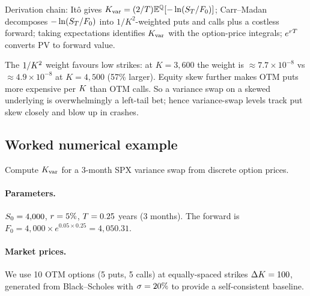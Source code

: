 \noindent
Derivation chain: It\^o gives
$K_{\text{var}}=(2/T)\mathbb{E}^{\mathbb{Q}}[-\ln(S_T/F_0)]$;
Carr--Madan decomposes $-\ln(S_T/F_0)$ into $1/K^2$-weighted
puts and calls plus a costless forward; taking expectations identifies
$K_{\text{var}}$ with the option-price integrals; $e^{rT}$
converts PV to forward value.

\begin{intuitionbox}[title={Why $1/K^2$ makes OTM puts dominate}]
\label{intuition:kvar_puts}
The $1/K^2$ weight favours low strikes: at $K=3{,}600$ the
weight is $\approx 7.7\times 10^{-8}$ vs $\approx 4.9\times 10^{-8}$
at $K=4{,}500$ (57\% larger). Equity skew further makes OTM puts more
expensive per $K$ than OTM calls. So a variance swap on a
skewed underlying is overwhelmingly a left-tail bet; hence
variance-swap levels track put skew closely and blow up in crashes.
\end{intuitionbox}

\subsection{Worked numerical example}
\label{subsec:varswap_numerical}

Compute $K_{\text{var}}$ for a 3-month SPX variance swap from
discrete option prices.

\paragraph{Parameters.}
$S_0 = 4{,}000$, $r = 5\%$, $T = 0.25$ years (3 months).
The forward is $F_0 = 4{,}000 \times e^{0.05 \times 0.25} = 4{,}050.31$.

\paragraph{Market prices.}
We use 10 OTM options (5 puts, 5 calls) at equally-spaced strikes
$\Delta K = 100$, generated from Black--Scholes with
$\sigma = 20\%$ to provide a self-consistent baseline.

